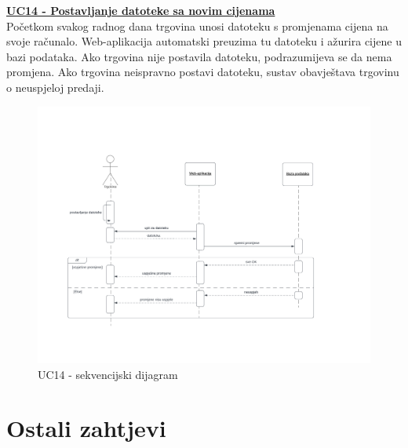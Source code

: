 			\underline{\textbf{UC14 - Postavljanje datoteke sa novim cijenama}}\\
				
				Početkom svakog radnog dana trgovina unosi datoteku s promjenama cijena na svoje računalo. Web-aplikacija automatski preuzima tu datoteku i ažurira cijene u bazi podataka. Ako trgovina nije postavila datoteku, podrazumijeva se da nema promjena. Ako trgovina neispravno postavi datoteku, sustav obavještava trgovinu o neuspjeloj predaji.
				
				\begin{figure}[H]
			\includegraphics[width=\textwidth]{slike/uc14.PNG} %
			\caption{UC14 - sekvencijski dijagram}
			\label{fig:promjene2} %
			\end{figure}
				\eject
	
		\section{Ostali zahtjevi}
		
		 
